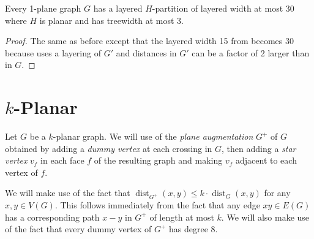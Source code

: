\documentclass{patmorin}
\DeclareMathOperator{\dist}{dist}
\begin{document}
\begin{thm}
  Every 1-plane graph $G$ has a layered $H$-partition of layered width at most 30 where $H$ is planar and has treewidth at most 3.
\end{thm}

\begin{proof}
  The same as before except that the layered width 15 from  becomes 30 because  uses a layering of $G'$ and distances in $G'$ can be a factor of 2 larger than in $G$.
\end{proof}


\section{$k$-Planar}


Let $G$ be a $k$-planar graph.  We will use of the \emph{plane augmentation} $G^+$ of $G$ obtained by adding a \emph{dummy vertex} at each crossing in $G$, then adding a \emph{star vertex} $v_f$ in each face $f$ of the resulting graph and making $v_f$ adjacent to each vertex of $f$.

We will make use of the fact that $\dist_{G^+}(x,y)\le k\cdot\dist_G(x,y)$ for any $x,y\in V(G)$.  This follows immediately from the fact that any edge $xy\in E(G)$ has a corresponding path $x-y$ in $G^+$ of length at most $k$.  We will also make use of the fact that every dummy vertex of $G^+$ has degree 8.  
\end{document}
